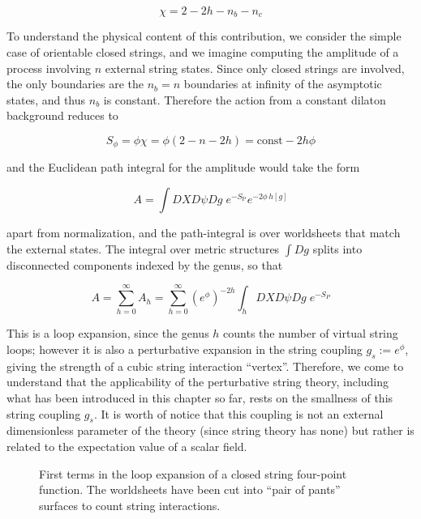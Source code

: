 \begin{equation}
	\chi = 2 - 2h - n_b - n_c
	\label{}
\end{equation}

To understand the physical content of this contribution, we consider the simple case of orientable closed strings, and we imagine computing the amplitude of a process involving $n$ external string states. Since only closed strings are involved, the only boundaries are the $n_b = n$ boundaries at infinity of the asymptotic states, and thus $n_b$ is constant. Therefore the action from a constant dilaton background reduces to

\begin{equation}
	S_\phi = \phi \chi = \phi(2 - n - 2h) = \text{const} - 2h\phi
	\label{}
\end{equation}

and the Euclidean path integral for the amplitude would take the form

\begin{equation}
	A = \int DX D\psi Dg \; e^{-S_\text{P}} e^{-2\phi \, h[g]}
	\label{}
\end{equation}

apart from normalization, and the path-integral is over worldsheets that match the external states. The integral over metric structures $\int Dg$ splits into disconnected components indexed by the genus, so that

\begin{equation}
	A = \sum_{h=0}^{\infty} A_h = \sum_{h=0}^\infty (e^\phi)^{-2h} \int_h DX D\psi Dg \; e^{-S_P}
	\label{perturbationseries}
\end{equation}

This is a loop expansion, since the genus $h$ counts the number of virtual string loops; however it is also a perturbative expansion in the string coupling $g_s := e^\phi$, giving the strength of a cubic string interaction ``vertex''. Therefore, we come to understand that the applicability of the perturbative string theory, including what has been introduced in this chapter so far, rests on the smallness of this string coupling $g_s$. It is worth of notice that this coupling is not an external dimensionless parameter of the theory (since string theory has none) but rather is related to the expectation value of a scalar field.

\begin{figure}[h!]
\centering
\def\svgwidth{300pt}
\captionsetup{width=0.8\textwidth}

\caption{First terms in the loop expansion of a closed string four-point function. The worldsheets have been cut into ``pair of pants'' surfaces to count string interactions.} \label{loopfigure}
\end{figure}


